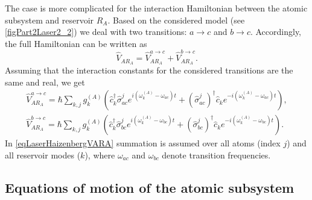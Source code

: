 The case is more complicated for the interaction Hamiltonian between the atomic
subsystem and reservoir $R_A$. Based on the considered model
(see \autoref{figPart2Laser2_2}) we deal with two transitions:
$a \rightarrow c$ and $b \rightarrow c$. Accordingly, the full
Hamiltonian can be written as
\begin{equation}
\hat{V}_{AR_A} = \hat{V}_{AR_A}^{a \rightarrow c} + \hat{V}_{AR_A}^{b \rightarrow c}.
\nonumber
\end{equation}
Assuming that the interaction constants for
the considered transitions are the same and real, we get
\begin{eqnarray}
\hat{V}_{AR_A}^{a \rightarrow c} = \hbar \sum_{k,j} 
g_k^{(A)}
 \left(
\hat{c}_k^{\dag}\hat{\sigma}_{ac}^{j} e^{i\left(\omega_k^{(A)} - \omega_{ac}\right)t} +
\left(\hat{\sigma}_{ac}^{j}\right)^{\dag}\hat{c}_k e^{-i\left(\omega_k^{(A)} - \omega_{ac}\right)t}
\right),
\nonumber \\
\hat{V}_{AR_A}^{b \rightarrow c} = \hbar \sum_{k,j} 
g_k^{(A)}
 \left(
\hat{c}_k^{\dag}\hat{\sigma}_{bc}^{j} e^{i\left(\omega_k^{(A)} - \omega_{bc}\right)t} +
\left(\hat{\sigma}_{bc}^{j}\right)^{\dag}\hat{c}_k e^{-i\left(\omega_k^{(A)} - \omega_{bc}\right)t}
\right).
\label{eqLaserHaizenbergVARA}
\end{eqnarray}
In \eqref{eqLaserHaizenbergVARA} summation is assumed over all
atoms (index $j$) and all reservoir modes ($k$), where
$\omega_{ac}$ and $\omega_{bc}$ denote transition frequencies.

\subsection{Equations of motion of the atomic subsystem}

